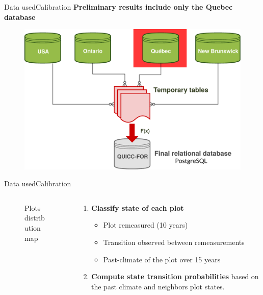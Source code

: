 \documentclass[10pt,aspectratio=149]{beamer}
\begin{document}

\begin{frame}[t]{Data used}{Calibration}
	\vspace{-1em}
	\center \textbf{Preliminary results include only the Quebec database}
\begin{figure}
	\includegraphics[width=.70\paperwidth]{Figs/quiccfor2.pdf}
\end{figure}

\end{frame}



\begin{frame}{Data used}{Calibration}
	
	\begin{columns}[c]
	\begin{column}[c]{.40\paperwidth}
		\begin{figure}
			\small{Plots distribution map}
		\end{figure}
	\end{column}
	\begin{column}[l]{.50\paperwidth}

	\begin{enumerate}
			\item \textbf{Classify state of each plot}
		\begin{itemize}
			\item Plot remeasured (10 years)
			\item Transition observed between remeasurements
			\item Past-climate of the plot over 15 years
		\end{itemize}
			\item \textbf{Compute state transition probabilities} based on the past climate and neighbors plot states.
	\end{enumerate}

	\end{column}
\end{columns}

\end{frame}
\end{document}
